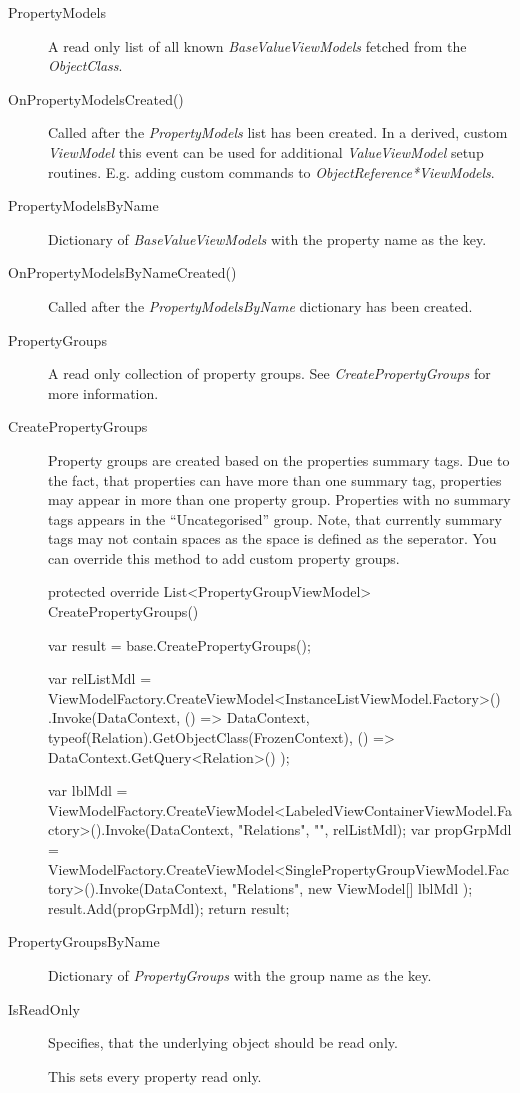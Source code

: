 \begin{description}
\item[PropertyModels] A read only list of all known \emph{BaseValueViewModels}
fetched from the \emph{ObjectClass}.
\item[OnPropertyModelsCreated()] Called after the \emph{PropertyModels} list has
been created. In a derived, custom \emph{ViewModel} this event can be used for
additional \emph{ValueViewModel} setup routines. E.g. adding custom commands to
\emph{ObjectReference*ViewModels}.
\item[PropertyModelsByName] Dictionary of \emph{BaseValueViewModels} with the
property name as the key.
\item[OnPropertyModelsByNameCreated()] Called after the
\emph{PropertyModelsByName} dictionary has been created.

\item[PropertyGroups] A read only collection of property groups. See
\emph{CreatePropertyGroups} for more information.
\item[CreatePropertyGroups] Property groups are created based on the properties
summary tags. Due to the fact, that properties can have more than one summary
tag, properties may appear in more than one property group. Properties with no
summary tags appears in the ``Uncategorised'' group. Note, that currently
summary tags may not contain spaces as the space is defined as the seperator.
You can override this method to add custom property groups. 
\begin{CS}
protected override List<PropertyGroupViewModel> CreatePropertyGroups()
{
    var result = base.CreatePropertyGroups();

    var relListMdl = ViewModelFactory.CreateViewModel<InstanceListViewModel.Factory>()
        .Invoke(DataContext, 
            () => DataContext,
             typeof(Relation).GetObjectClass(FrozenContext), 
             () => DataContext.GetQuery<Relation>()
        ); 

    var lblMdl = ViewModelFactory.CreateViewModel<LabeledViewContainerViewModel.Factory>().Invoke(DataContext, "Relations", "", relListMdl);
    var propGrpMdl = ViewModelFactory.CreateViewModel<SinglePropertyGroupViewModel.Factory>().Invoke(DataContext, "Relations", new ViewModel[] { lblMdl });
    result.Add(propGrpMdl);
    return result;
}
\end{CS}

\item[PropertyGroupsByName] Dictionary of \emph{PropertyGroups} with the
group name as the key.

\item[IsReadOnly] Specifies, that the underlying object should be read only.
\begin{note}This sets every property read only.\end{note}

\end{description}

